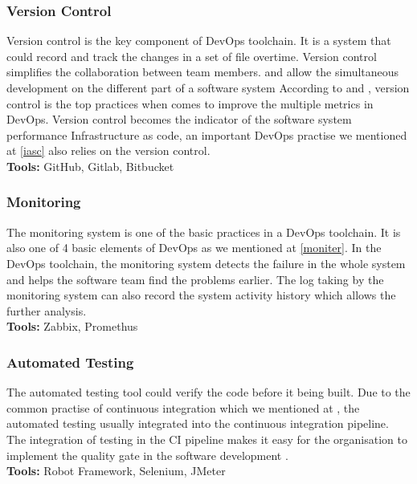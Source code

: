 \subsubsection{Version Control}
Version control is the key component of DevOps toolchain. It is a system that could record and track the changes in a set of file overtime. Version control simplifies the collaboration between team members. and allow the simultaneous development on the different part of a software system According to \cite{Sourcean53:online} and \cite{velasquez2014state}, version control is the top practices when comes to improve the multiple metrics in DevOps. Version control becomes the indicator of the software system performance \cite{Sourcean53:online} Infrastructure as code, an important DevOps practise we mentioned at \ref{iasc} also relies on the version control.\\
\textbf{Tools:} GitHub, Gitlab, Bitbucket
\subsubsection{Monitoring}
The monitoring system is one of the basic practices in a DevOps toolchain\cite{forsgren20192019}. It is also one of 4 basic elements of DevOps as we mentioned at \ref{moniter}. In the DevOps toolchain, the monitoring system detects the failure in the whole system and helps the software team find the problems earlier. The log taking by the monitoring system can also record the system activity history which allows the further analysis.\\
\textbf{Tools:} Zabbix, Promethus
\subsubsection{Automated Testing}
The automated testing tool could verify the code before it being built. Due to the common practise of continuous integration which we mentioned at \label{CD}, the automated testing usually integrated into the continuous integration pipeline. The integration of testing in the CI pipeline makes it easy for the organisation to implement the quality gate in the software development \cite{huttermann2012devops}.
\\
\textbf{Tools:} Robot Framework, Selenium, JMeter

